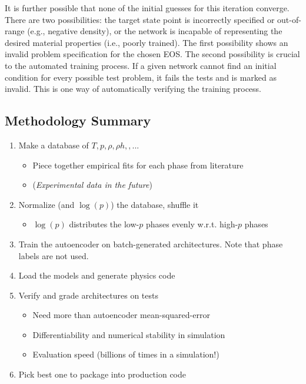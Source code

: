 \documentclass[]{article}
\begin{document}
It is further possible that none of the initial guesses for this iteration
converge. There are two possibilities: the target state point is
incorrectly specified or out-of-range (e.g., negative density), or the
network is incapable of representing the desired material properties
(i.e., poorly trained). The first possibility shows an invalid
problem specification for the chosen EOS. The second possibility is
crucial to the automated training process. If a given network cannot
find an initial condition for every possible test problem, it fails
the tests and is marked as invalid. This is one way of automatically
verifying the training process.


\hypertarget{header-n3493}{%
\subsection{Methodology Summary}\label{header-n3493}}

\begin{enumerate}
\def\labelenumi{\arabic{enumi}.}
\item
  Make a database of \(T,p,\rho,\rho h, ,...\)
  \begin{itemize}
  \item
    Piece together empirical fits for each phase from literature
  \item
    (\emph{Experimental data in the future})
  \end{itemize}
\item
  Normalize (and \(\log(p)\)) the database, shuffle it

  \begin{itemize}
  \item
    \(\log(p)\) distributes the low-\(p\) phases evenly w.r.t.
    high-\(p\) phases
  \end{itemize}
\item
  Train the autoencoder on batch-generated architectures. Note that
  phase labels are not used.
\item
  Load the models and generate physics code
\item
  Verify and grade architectures on tests

  \begin{itemize}
  \item
    Need more than autoencoder mean-squared-error
  \item
    Differentiability and numerical stability in simulation
  \item
    Evaluation speed (billions of times in a simulation!)
  \end{itemize}
\item
  Pick best one to package into production code
\end{enumerate}
\end{document}
